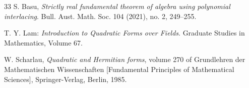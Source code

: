 \documentclass[sn-mathphys-num]{sn-jnl}%
\begin{document}
\begin{thebibliography}{33}
 S. Basu, {\it Strictly real fundamental theorem of algebra using polynomial interlacing}. Bull.
Aust. Math. Soc. 104 (2021), no. 2, 249–255.

T. Y. Lam:
\textit{Introduction to Quadratic Forms over Fields}.
Graduate Studies in Mathematics, Volume 67.



W. Scharlau, {\it Quadratic and Hermitian forms}, volume 270 of Grundlehren
der Mathematischen Wissenschaften [Fundamental Principles of Mathematical
Sciences], Springer-Verlag, Berlin, 1985.




\end{thebibliography}
\end{document}
